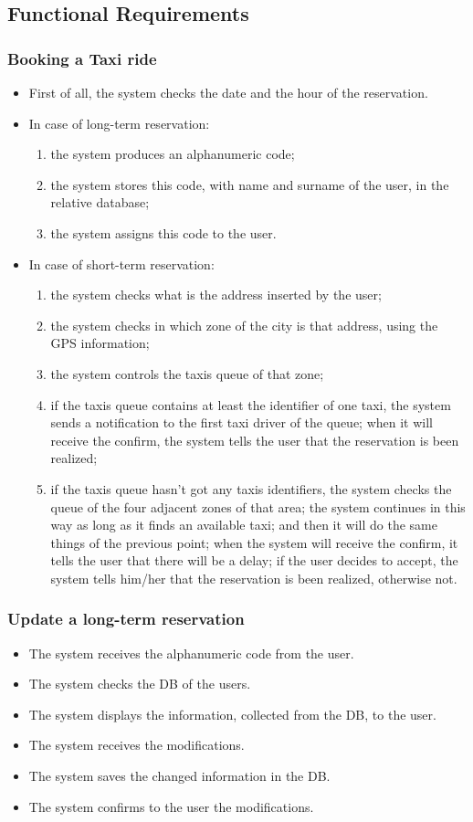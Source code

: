 	\subsection{Functional Requirements}
		\subsubsection{Booking a Taxi ride}
		\begin{itemize}
		\item First of all, the system checks the date and the hour of the reservation. 
		\item In case of long-term reservation:
		\begin{enumerate}
		\item the system produces an alphanumeric code;
		\item the system stores this code, with name and surname of the user, in the relative database;
		\item the system assigns this code to the user.
		\end{enumerate}
		\item In case of short-term reservation:
		\begin{enumerate}
		\item the system checks what is the address inserted by the user;
		\item the system checks in which zone of the city is that address, using the GPS information;
		\item the system controls the taxis queue of that zone;
		\item if the taxis queue contains at least the identifier of one taxi, the system sends a notification to the first taxi driver of the queue; when it will receive the confirm, the system tells the user that the reservation is been realized;
		\item if the taxis queue hasn't got any taxis identifiers, the system checks the queue of the four adjacent zones of that area; the system continues in this way as long as it finds an available taxi; and then it will do the same things of the previous point; when the system will receive the confirm, it tells the user that there will be a delay; if the user decides to accept, the system tells him/her that the reservation is been realized, otherwise not.
		\end{enumerate}
		\end{itemize}
		\subsubsection{Update a long-term reservation}
		\begin{itemize}
		\item The system receives the alphanumeric code from the user.
		\item The system checks the DB of the users.
		\item The system displays the information, collected from the DB, to the user.
		\item The system receives the modifications.
		\item The system saves the changed information in the DB.
		\item The system confirms to the user the modifications.
		\end{itemize}
